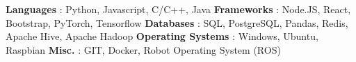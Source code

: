\begin{cventries}  
\skillentry
    {
    \space \textbf{Languages} : Python, Javascript, C/C++, Java
    \space \textbf{Frameworks} : Node.JS, React, Bootstrap, PyTorch,  Tensorflow
    \space \textbf{Databases} : SQL, PostgreSQL, Pandas, Redis, Apache Hive, Apache Hadoop
    \space \textbf{Operating Systems} : Windows, Ubuntu, Raspbian
    \space \textbf{Misc.} : GIT, Docker, Robot Operating System (ROS)
    }
    

\end{cventries}
\vspace{0.5 cm}